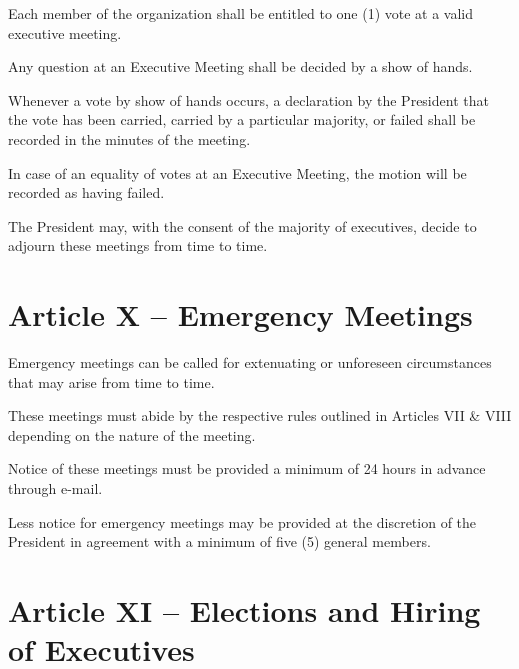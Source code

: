 \documentclass[12pt,a4paper]{article}
\begin{document}
\begin{constitutionlist}
\item Each member of the organization shall be entitled to one (1) vote at a valid executive meeting.

\item Any question at an Executive Meeting shall be decided by a show of hands.

\item Whenever a vote by show of hands occurs, a declaration by the President that the vote has been carried, carried by a particular majority, or failed shall be recorded in the minutes of the meeting.

\item In case of an equality of votes at an Executive Meeting, the motion will be recorded as having failed.

\item The President may, with the consent of the majority of executives, decide to adjourn these meetings from time to time.
\end{constitutionlist}

\section{Article X – Emergency Meetings}

\begin{constitutionlist}
\item Emergency meetings can be called for extenuating or unforeseen circumstances that may arise from time to time.

\item These meetings must abide by the respective rules outlined in Articles VII \& VIII depending on the nature of the meeting.

\item Notice of these meetings must be provided a minimum of 24 hours in advance through e-mail.

\item Less notice for emergency meetings may be provided at the discretion of the President in agreement with a minimum of five (5) general members.
\end{constitutionlist}

\section{Article XI – Elections and Hiring of Executives}
\end{document}

